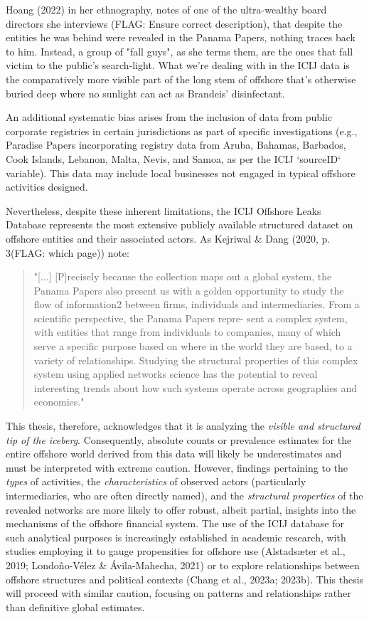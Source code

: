 Hoang (2022) in her ethnography, notes of one of the ultra-wealthy board directors she interviews (FLAG: Ensure correct description), that despite the entities he was behind were revealed in the Panama Papers, nothing traces back to him. Instead, a group of "fall guys", as she terms them, are the ones that fall victim to the public's search-light. What we're dealing with in the ICIJ data is the comparatively more visible part of the long stem of offshore that's otherwise buried deep where no sunlight can act as Brandeis' disinfectant. 

An additional systematic bias arises from the inclusion of data from public corporate registries in certain jurisdictions as part of specific investigations (e.g., Paradise Papers incorporating registry data from Aruba, Bahamas, Barbados, Cook Islands, Lebanon, Malta, Nevis, and Samoa, as per the ICIJ `sourceID` variable). This data may include local businesses not engaged in typical offshore activities designed.

Nevertheless, despite these inherent limitations, the ICIJ Offshore Leaks Database represents the most extensive publicly available structured dataset on offshore entities and their associated actors. As Kejriwal \& Dang (2020, p. 3(FLAG: which page)) note: 

\begin{quote}
"[...] [P]recisely because the collection maps out a global system, the Panama Papers also present us with a golden opportunity to study the flow of information2 between firms, individuals and intermediaries. From a scientific perspective, the Panama Papers repre- sent a complex system, with entities that range from individuals to companies, many of which serve a specific purpose based on where in the world they are based, to a variety of relationships. Studying the structural properties of this complex system using applied networks science has the potential to reveal interesting trends about how such systems operate across geographies and economies."
\end{quote}

This thesis, therefore, acknowledges that it is analyzing the \textit{visible and structured tip of the iceberg}. Consequently, absolute counts or prevalence estimates for the entire offshore world derived from this data will likely be underestimates and must be interpreted with extreme caution. However, findings pertaining to the \textit{types} of activities, the \textit{characteristics} of observed actors (particularly intermediaries, who are often directly named), and the \textit{structural properties} of the revealed networks are more likely to offer robust, albeit partial, insights into the mechanisms of the offshore financial system. The use of the ICIJ database for such analytical purposes is increasingly established in academic research, with studies employing it to gauge propensities for offshore use (Alstadsæter et al., 2019; Londoño-Vélez \& Ávila-Mahecha, 2021) or to explore relationships between offshore structures and political contexts (Chang et al., 2023a; 2023b). This thesis will proceed with similar caution, focusing on patterns and relationships rather than definitive global estimates.

